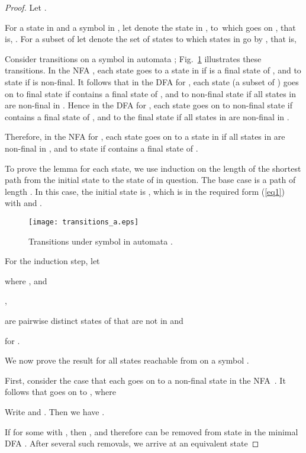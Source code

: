 \documentclass[runningheads]{llncs}
\begin{document}
\begin{proof}
 Let . 

 For a state  in  and a symbol  in , 
 let  denote the state in , to~which  goes on ,
 that is, .
 For a subset  of  let  denote
 the set of states to which states in  go by ,
 that is,
 
 Consider transitions on a symbol 
 in automata ; 
 Fig.~\ref{fig:transitions} illustrates these transitions.
 In the NFA ,
 each state  goes to a state in  if  is a final state of ,
 and to state   if  is non-final.
 It follows that in the DFA  for ,
 each state  (a subset of )
 goes on  to  final state  if  contains a final state of ,
 and to non-final state  if all states in  are non-final in .
 Hence in the DFA  for ,
 each state  goes on  
 to non-final state  if  contains a final state of ,
 and to the final state  if all states in  are non-final in .

 Therefore, in the NFA  for ,
 each state  goes on  to a state in
   if all states in  are non-final in ,
 and to state   if  contains a final state of .

 To prove the lemma for each state,
 we use induction on the length of the shortest
 path from the initial state to the state of  in question.
 The base case is a path of length .  In this case,
 the initial state is , 
 which is in the required form (\ref{eq1}) with
  and .

 \begin{figure}[h]\label{-----fig4}
 \centering
 \texttt{[image: transitions\_a.eps]}
 \caption{Transitions under symbol  in automata .}
 \label{fig:transitions}
 \end{figure}


 For the induction step, let
  
 where , and

   ,

    are pairwise distinct states of 
            that are not in  and

    for .

\bigskip
 We now prove the result for all states reachable from 
 on a symbol .

 First, consider the case that each  goes on 
 to a non-final state  in the NFA~.
 It follows that  goes on 
 to ,
 where
 
 Write  and .
 Then we have .

 If  for some  with ,
 then ,
 and therefore  can be removed from state  
 in the minimal DFA .
 After  several such removals, we arrive at an equivalent state
 

\end{proof}
\end{document}
